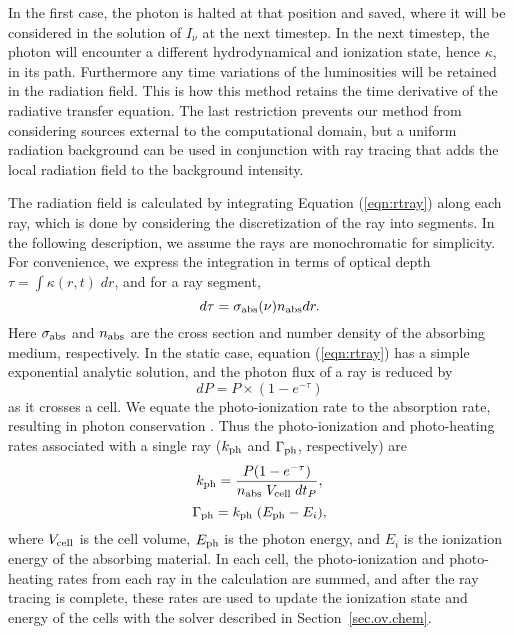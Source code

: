 In the first case, the photon is halted at that position and saved,
where it will be considered in the solution of $I_\nu$ at the next
timestep.  In the next timestep, the photon will encounter a different
hydrodynamical and ionization state, hence $\kappa$, in its path.
Furthermore any time variations of the luminosities will be retained
in the radiation field.  This is how this method retains the time
derivative of the radiative transfer equation.  The last restriction
prevents our method from considering sources external to the
computational domain, but a uniform radiation background can be used
in conjunction with ray tracing that adds the local radiation field to
the background intensity.

The radiation field is calculated by integrating Equation
(\ref{eqn:rtray}) along each ray, which is done by considering the
discretization of the ray into segments.  In the following
description, we assume the rays are monochromatic for simplicity.  For
convenience, we express the integration in terms of optical depth
$\tau = \int \kappa(r,t) \; dr$, and for a ray segment,
%
\begin{equation}
  \label{eqn:dtau}
  d\tau = \sigma_{\rm abs}(\nu) n_{\rm abs} dr.
\end{equation}
Here $\sigma_{\rm abs}$ and $n_{\rm abs}$ are the cross section and
number density of the absorbing medium, respectively.  In the static
case, equation (\ref{eqn:rtray}) has a simple exponential analytic
solution, and the photon flux of a ray is reduced by
%
\begin{equation}
  \label{eqn:flux}
  dP = P \times (1 - e^{-\tau})
\end{equation}
as it crosses a cell.  We equate the photo-ionization rate to the
absorption rate, resulting in photon conservation \citep{Abel99_RT,
  Mellema06}.  Thus the photo-ionization and
photo-heating rates associated with a single ray ($k_{\rm ph}$ and
$\Gamma_{\rm ph}$, respectively)  are
%
\begin{equation}
  \label{eqn:kph}
  k_{\rm ph} = \frac{P (1 - e^{-\tau})}{n_{\rm abs} \; V_{\rm cell} \; dt_P},
\end{equation}
\begin{equation}
  \label{eqn:gamma}
  \Gamma_{\rm ph} = k_{\rm ph} \; (E_{\rm ph} - E_i),
\end{equation}
where $V_{\rm cell}$ is the cell volume, $E_{\rm ph}$ is the photon
energy, and $E_i$ is the ionization energy of the absorbing material.
In each cell, the photo-ionization and photo-heating rates from each
ray in the calculation are summed, and after the ray tracing is
complete, these rates are used to update the ionization state and
energy of the cells with the solver described in Section~\ref{sec.ov.chem}.


